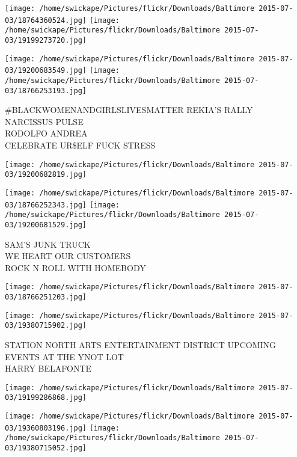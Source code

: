 \documentclass[10pt,letterpaper]{article}
\begin{document}
\texttt{[image: /home/swickape/Pictures/flickr/Downloads/Baltimore 2015-07-03/18764360524.jpg]}
\texttt{[image: /home/swickape/Pictures/flickr/Downloads/Baltimore 2015-07-03/19199273720.jpg]}

\texttt{[image: /home/swickape/Pictures/flickr/Downloads/Baltimore 2015-07-03/19200683549.jpg]}
\texttt{[image: /home/swickape/Pictures/flickr/Downloads/Baltimore 2015-07-03/18766253193.jpg]}

\#BLACKWOMENANDGIRLSLIVESMATTER REKIA'S RALLY\\
NARCISSUS PULSE\\
RODOLFO ANDREA\\
CELEBRATE UR\$ELF FUCK STRESS\\
\pagebreak

\texttt{[image: /home/swickape/Pictures/flickr/Downloads/Baltimore 2015-07-03/19200682819.jpg]}

\vspace{0.25in}
\texttt{[image: /home/swickape/Pictures/flickr/Downloads/Baltimore 2015-07-03/18766252343.jpg]}
\texttt{[image: /home/swickape/Pictures/flickr/Downloads/Baltimore 2015-07-03/19200681529.jpg]}

SAM'S JUNK TRUCK\\
WE HEART OUR CUSTOMERS\\
ROCK N ROLL WITH HOMEBODY\\
\pagebreak

\texttt{[image: /home/swickape/Pictures/flickr/Downloads/Baltimore 2015-07-03/18766251203.jpg]}

\vspace{0.25in}
\texttt{[image: /home/swickape/Pictures/flickr/Downloads/Baltimore 2015-07-03/19380715902.jpg]}

STATION NORTH ARTS ENTERTAINMENT DISTRICT UPCOMING EVENTS AT THE YNOT LOT\\
HARRY BELAFONTE\\
\pagebreak

\texttt{[image: /home/swickape/Pictures/flickr/Downloads/Baltimore 2015-07-03/19199286868.jpg]}

\vspace{0.25in}
\texttt{[image: /home/swickape/Pictures/flickr/Downloads/Baltimore 2015-07-03/19360803196.jpg]}
\texttt{[image: /home/swickape/Pictures/flickr/Downloads/Baltimore 2015-07-03/19380715052.jpg]}
\end{document}
